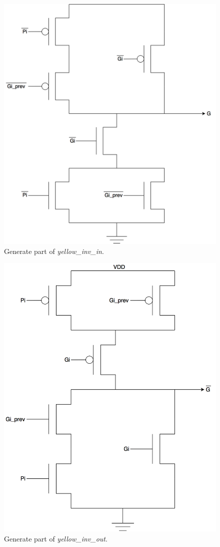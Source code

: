 \begin{figure}[H]
  \centering
  \captionsetup{justification=centering}
  \includegraphics[scale=0.15]{../figures/G_inv_in}
  \caption{Generate part of \textit{yellow\_inv\_in}.} \label{fig:G_inv_in}
\end{figure}

\begin{figure}[H]
  \centering
  \captionsetup{justification=centering}
  \includegraphics[scale=0.15]{../figures/G_inv_out}
  \caption{Generate part of \textit{yellow\_inv\_out}.} \label{fig:G_inv_out}
\end{figure}

